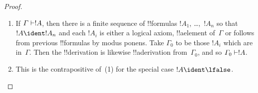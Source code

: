 \documentclass[../../../include/open-logic-section]{subfiles}
\begin{document}
\begin{proof}
  \begin{enumerate}
    \item If $\Gamma \Proves !A$, then there is a finite sequence of
      !!{formula}s $!A_1$, \dots,~$!A_n$ so that $!A \ident !A_n$ and
      each $!A_i$ is either a logical axiom, !!a{element} of~$\Gamma$
      or follows from previous !!{formula}s by modus ponens.  Take
      $\Gamma_0$ to be those $!A_i$ which are in~$\Gamma$.  Then the
      !!{derivation} is likewise !!a{derivation} from~$\Gamma_0$, and
      so $\Gamma_0 \Proves !A$.
    \item This is the contrapositive of~(1) for the special case $!A
      \ident \lfalse$.
\end{enumerate}
\end{proof}
\end{document}
